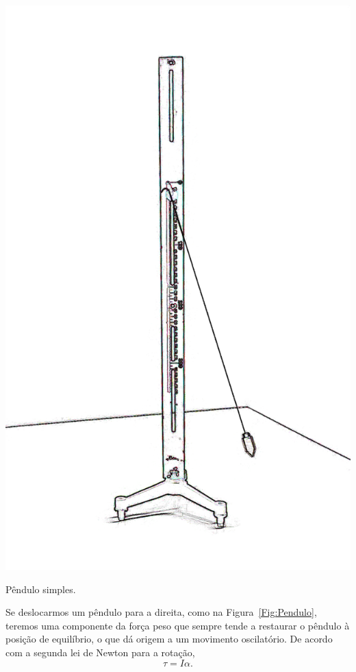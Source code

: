 \begin{marginfigure}
	\centering
	\includegraphics[width=\textwidth]{Ilustrations/Pendulo_simples.png}
	\caption{Pêndulo simples.}
\end{marginfigure}


Se deslocarmos um pêndulo para a direita, como na Figura~\ref{Fig:Pendulo}, teremos uma componente da força peso que sempre tende a restaurar o pêndulo à posição de equilíbrio, o que dá origem a um movimento oscilatório. De acordo com a segunda lei de Newton para a rotação,
\begin{equation}
    \tau = I\alpha.
\end{equation}

